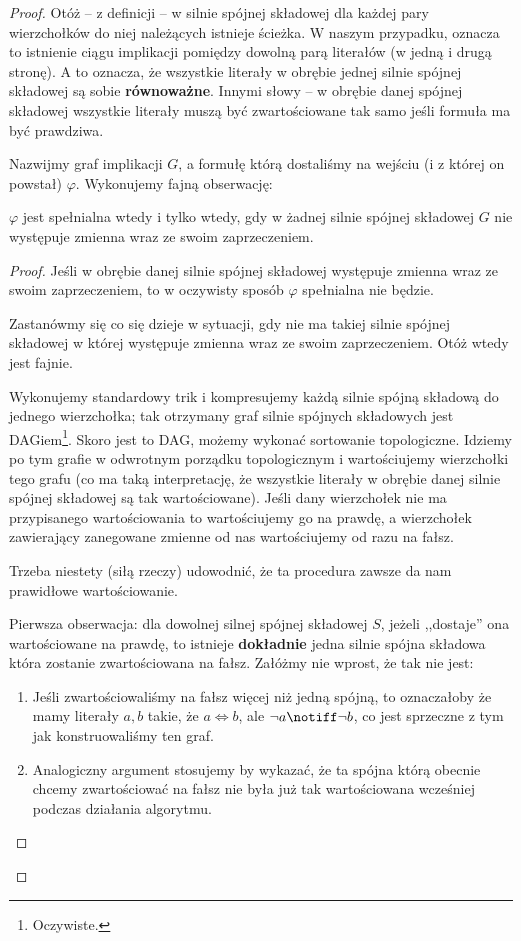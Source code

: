 \begin{proof}
Otóż -- z definicji -- w silnie spójnej składowej dla każdej pary wierzchołków do niej należących istnieje ścieżka. W naszym przypadku, oznacza to istnienie ciągu implikacji pomiędzy dowolną parą literałów (w jedną i drugą stronę). A to oznacza, że wszystkie literały w obrębie jednej silnie spójnej składowej są sobie \textbf{równoważne}. Innymi słowy -- w obrębie danej spójnej składowej wszystkie literały muszą być zwartościowane tak samo jeśli formuła ma być prawdziwa. 

Nazwijmy graf implikacji \(G\), a formułę którą dostaliśmy na wejściu (i z której on powstał) \(\varphi\). Wykonujemy fajną obserwację:

\begin{lemma}
\(\varphi\) jest spełnialna wtedy i tylko wtedy, gdy w żadnej silnie spójnej składowej \(G\) nie występuje zmienna wraz ze swoim zaprzeczeniem. 
\end{lemma}
\begin{proof}
Jeśli w obrębie danej silnie spójnej składowej występuje zmienna wraz ze swoim zaprzeczeniem, to w oczywisty sposób \(\varphi\) spełnialna nie będzie. 

Zastanówmy się co się dzieje w sytuacji, gdy nie ma takiej silnie spójnej składowej w której występuje zmienna wraz ze swoim zaprzeczeniem. Otóż wtedy jest fajnie.

Wykonujemy standardowy trik i kompresujemy każdą silnie spójną składową do jednego wierzchołka; tak otrzymany graf silnie spójnych składowych jest DAGiem\footnote{Oczywiste.}. Skoro jest to DAG, możemy wykonać sortowanie topologiczne. Idziemy po tym grafie w odwrotnym porządku topologicznym i wartościujemy wierzchołki tego grafu (co ma taką interpretację, że wszystkie literały w obrębie danej silnie spójnej składowej są tak wartościowane). Jeśli dany wierzchołek nie ma przypisanego wartościowania to wartościujemy go na prawdę, a wierzchołek zawierający zanegowane zmienne od nas wartościujemy od razu na fałsz. 

Trzeba niestety (siłą rzeczy) udowodnić, że ta procedura zawsze da nam prawidłowe wartościowanie.

Pierwsza obserwacja: dla dowolnej silnej spójnej składowej \(S\), jeżeli ,,dostaje'' ona wartościowane na prawdę, to istnieje \textbf{dokładnie} jedna silnie spójna składowa która zostanie zwartościowana na fałsz. Załóżmy nie wprost, że tak nie jest:

\begin{enumerate}
    \item Jeśli zwartościowaliśmy na fałsz więcej niż jedną spójną, to oznaczałoby że mamy literały \(a, b\) takie, że \(a \iff b\), ale \(\neg a \notiff \neg b\), co jest sprzeczne z tym jak konstruowaliśmy ten graf. 
    \item Analogiczny argument stosujemy by wykazać, że ta spójna którą obecnie chcemy zwartościować na fałsz nie była już tak wartościowana wcześniej podczas działania algorytmu. 
\end{enumerate}


\end{proof}
\end{proof}
